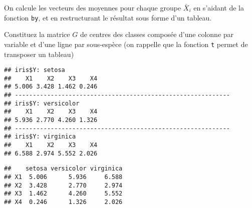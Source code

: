 \documentclass[
]{article}
\newenvironment{Shaded}{\begin{snugshade}}{\end{snugshade}}
\newcommand{\DecValTok}[1]{\textcolor[rgb]{0.00,0.00,0.81}{#1}}
\newcommand{\KeywordTok}[1]{\textcolor[rgb]{0.13,0.29,0.53}{\textbf{#1}}}
\newcommand{\NormalTok}[1]{#1}
\newcommand{\OperatorTok}[1]{\textcolor[rgb]{0.81,0.36,0.00}{\textbf{#1}}}
\newcommand{\StringTok}[1]{\textcolor[rgb]{0.31,0.60,0.02}{#1}}
\begin{document}
On calcule les vecteurs des moyennes pour chaque groupe \(\bar{X}_{i}\)
en s'aidant de la fonction \texttt{by}, et en restructurant le résultat
sous forme d'un tableau.

Constituez la matrice \(G\) de centres des classes composée d'une
colonne par variable et d'une ligne par sous-espèce (on rappelle que la
fonction \texttt{t} permet de transposer un tableau)

\begin{Shaded}
\end{Shaded}

\begin{verbatim}
## iris$Y: setosa
##    X1    X2    X3    X4 
## 5.006 3.428 1.462 0.246 
## ------------------------------------------------------------ 
## iris$Y: versicolor
##    X1    X2    X3    X4 
## 5.936 2.770 4.260 1.326 
## ------------------------------------------------------------ 
## iris$Y: virginica
##    X1    X2    X3    X4 
## 6.588 2.974 5.552 2.026
\end{verbatim}

\begin{Shaded}
\end{Shaded}

\begin{verbatim}
##    setosa versicolor virginica
## X1  5.006      5.936     6.588
## X2  3.428      2.770     2.974
## X3  1.462      4.260     5.552
## X4  0.246      1.326     2.026
\end{verbatim}

\begin{Shaded}
\end{Shaded}
\end{document}
